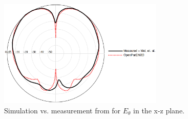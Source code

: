 \documentclass[titlepage]{article}
\renewcommand\_{\textunderscore\linebreak[1]}
\begin{document}
\begin{figure}[H]
  \centering
  \includegraphics[width=0.7\textwidth]{../regression/OpenParEM3D/antenna/patch_study/screenshots/patch_xz_pattern}
  \caption{Simulation vs. measurement from \cite{Mei} for $E_{\theta}$ in the x-z plane.}
  \label{fig:patch_xz_pattern}
\end{figure}
\end{document}
